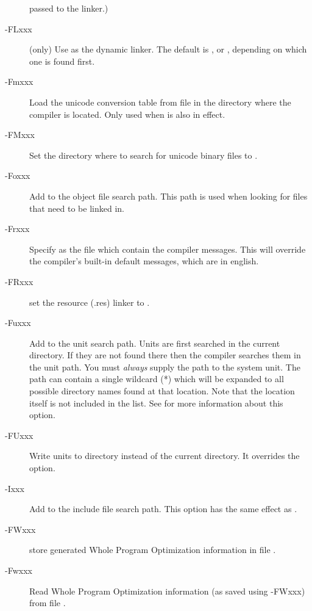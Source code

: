 \begin{description}
passed to the linker.)
\item[-FLxxx] (\linux only) Use  as the dynamic linker. The default is , or
, depending on which one is found first.
\item[-Fmxxx] Load the unicode conversion table from file  in
the directory where the compiler is located. Only used when  is
also in effect.
\item[-FMxxx]  Set the directory where to search for unicode binary files to .
\item[-Foxxx] Add  to the object file search path.
This path is used when looking for files that need to be linked in.
\item [-Frxxx] Specify  as the file which contain the compiler
messages. This will override the compiler's built-in default messages, which
are in english.
\item[-FRxxx] set the resource (.res) linker to .
\item [-Fuxxx] Add  to the unit search path.
Units are first searched in the current directory.
If they are not found there then the compiler searches them in the unit path.
You must {\em always} supply the path to the system unit. The 
path can contain a single wildcard (*) which will be expanded to all
possible directory names found at that location. Note that the location
itself is not included in the list. See  for more
information about this option.
\item [-FUxxx] Write units to directory  instead of the current 
directory. It overrides the  option.
\item [-Ixxx]  Add  to the include file search path.
This option has the same effect as .
\item[-FWxxx] store generated Whole Program Optimization information in file
.
\item[-Fwxxx] Read Whole Program Optimization information (as saved using -FWxxx) from file
.
\end{description}

